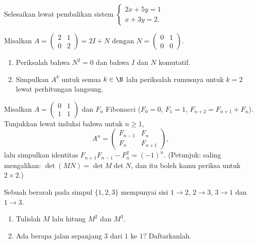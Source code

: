 \begin{exercise}[$\star$]\label{exo:g12:matrix:3}
Selesaikan lewat pembalikan  sistem
$\begin{cases} 2x + 5y = 1\\ x + 3y = 2 . \end{cases}$
\end{exercise}

\begin{exercise}[$\star\star$]\label{exo:g12:matrix:4}
Misalkan $A = \begin{pmatrix} 2 & 1\\ 0 & 2\end{pmatrix} = 2I + N$ dengan
$N = \begin{pmatrix} 0 & 1\\ 0 & 0 \end{pmatrix}$.
\begin{enumerate}
  \item Periksalah bahwa $N^2 = 0$ dan bahwa $I$ dan $N$ komutatif.
  \item Simpulkan $A^k$ untuk semua $k \in \N$ lalu periksalah rumusnya untuk $k=2$
        lewat perhitungan langsung.
\end{enumerate}
\end{exercise}

\begin{exercise}[$\star\star$]\label{exo:g12:matrix:5}
Misalkan $A = \begin{pmatrix} 0 & 1\\ 1 & 1\end{pmatrix}$ dan $F_n$ 
Fibonacci ($F_0 = 0$, $F_1 = 1$, $F_{n+2} = F_{n+1} + F_n$). Tunjukkan lewat
induksi bahwa untuk $n \geq 1$,
\[
A^n = \begin{pmatrix} F_{n-1} & F_n\\ F_n & F_{n+1}\end{pmatrix},
\]
lalu simpulkan identitas $F_{n+1}F_{n-1} - F_n^2 = (-1)^n$.
(Petunjuk:  saling mengalikan: $\det(MN) = \det M \det N$, dan itu boleh
kamu periksa untuk  $2\times2$.)
\end{exercise}

\begin{exercise}[$\star\star$]\label{exo:g12:matrix:6}
Sebuah  berarah pada simpul $\{1, 2, 3\}$ mempunyai sisi
$1\to2$, $2\to3$, $3\to1$ dan $1\to3$.
\begin{enumerate}
  \item Tulislah  $M$ lalu hitung $M^2$ dan $M^3$.
  \item Ada berapa jalan sepanjang $3$ dari $1$ ke $1$? Daftarkanlah.
\end{enumerate}
\end{exercise}

